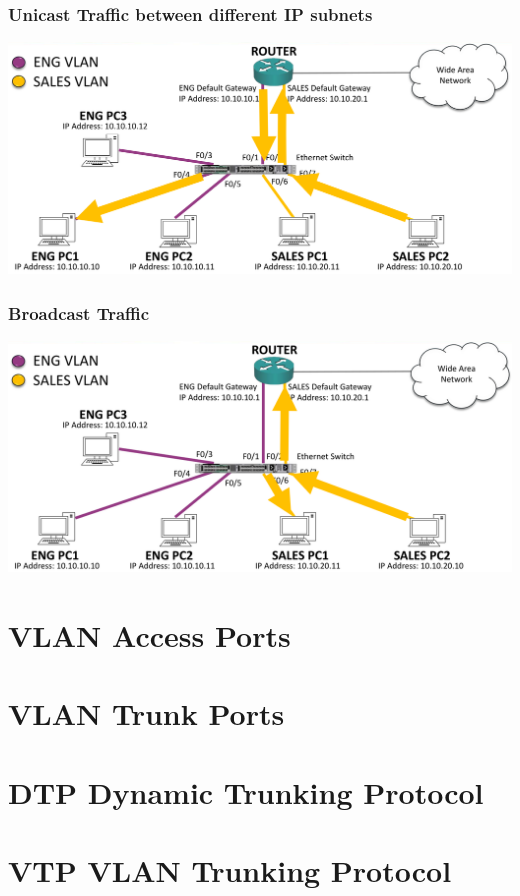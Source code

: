 \documentclass[pdflatex,compress,mathserif]{beamer}
\begin{document}
\begin{frame}
	\frametitle{Unicast Traffic between different IP subnets}
	\begin{center}
		\includegraphics[width=\linewidth]{img/img16}
	\end{center}
\end{frame}

\begin{frame}
	\frametitle{Broadcast Traffic}
	\begin{center}
		\includegraphics[width=\linewidth]{img/img17}
	\end{center}
\end{frame}

\section{VLAN Access Ports}

\section{VLAN Trunk Ports}

\section{DTP Dynamic Trunking Protocol}

\section{VTP VLAN Trunking Protocol}
\end{document}

